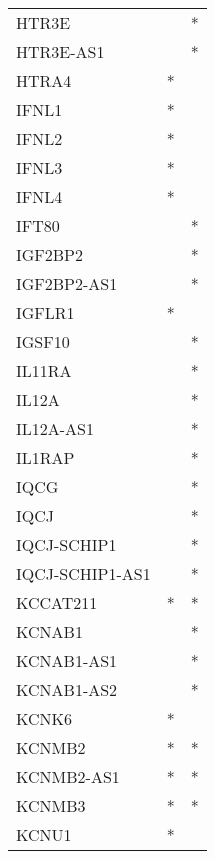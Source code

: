 \begin{longtable}{lcc}
HTR3E            &                &          * \\
HTR3E-AS1        &                &          * \\
HTRA4            &              * &            \\
IFNL1            &              * &            \\
IFNL2            &              * &            \\
IFNL3            &              * &            \\
IFNL4            &              * &            \\
IFT80            &                &          * \\
IGF2BP2          &                &          * \\
IGF2BP2-AS1      &                &          * \\
IGFLR1           &              * &            \\
IGSF10           &                &          * \\
IL11RA           &                &          * \\
IL12A            &                &          * \\
IL12A-AS1        &                &          * \\
IL1RAP           &                &          * \\
IQCG             &                &          * \\
IQCJ             &                &          * \\
IQCJ-SCHIP1      &                &          * \\
IQCJ-SCHIP1-AS1  &                &          * \\
KCCAT211         &              * &          * \\
KCNAB1           &                &          * \\
KCNAB1-AS1       &                &          * \\
KCNAB1-AS2       &                &          * \\
KCNK6            &              * &            \\
KCNMB2           &              * &          * \\
KCNMB2-AS1       &              * &          * \\
KCNMB3           &              * &          * \\
KCNU1            &              * &            \\

\end{longtable}
